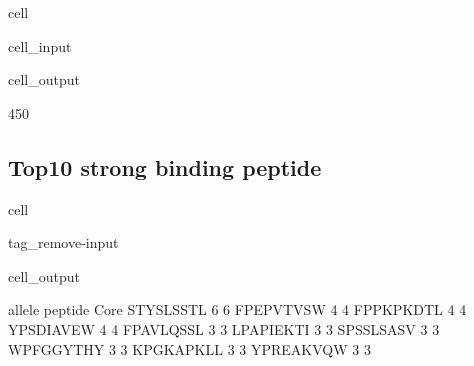\documentclass[letterpaper,10pt,english]{jupyterBook}
\begin{document}
\begin{sphinxuseclass}{cell}\begin{sphinxVerbatimInput}

\begin{sphinxuseclass}{cell_input}
\begin{sphinxVerbatim}[commandchars=\\\{\}]
\end{sphinxVerbatim}

\end{sphinxuseclass}\end{sphinxVerbatimInput}
\begin{sphinxVerbatimOutput}

\begin{sphinxuseclass}{cell_output}
\begin{sphinxVerbatim}[commandchars=\\\{\}]
450
\end{sphinxVerbatim}

\end{sphinxuseclass}\end{sphinxVerbatimOutput}

\end{sphinxuseclass}

\subsection{Top10 strong binding peptide}
\label{\detokenize{ipynb/chapter2:top10-strong-binding-peptide}}
\begin{sphinxuseclass}{cell}
\begin{sphinxuseclass}{tag_remove-input}\begin{sphinxVerbatimOutput}

\begin{sphinxuseclass}{cell_output}
\begin{sphinxVerbatim}[commandchars=\\\{\}]
           allele  peptide
Core                      
STYSLSSTL       6        6
FPEPVTVSW       4        4
FPPKPKDTL       4        4
YPSDIAVEW       4        4
FPAVLQSSL       3        3
LPAPIEKTI       3        3
SPSSLSASV       3        3
WPFGGYTHY       3        3
KPGKAPKLL       3        3
YPREAKVQW       3        3
\end{sphinxVerbatim}

\end{sphinxuseclass}\end{sphinxVerbatimOutput}

\end{sphinxuseclass}
\end{sphinxuseclass}
\end{document}
